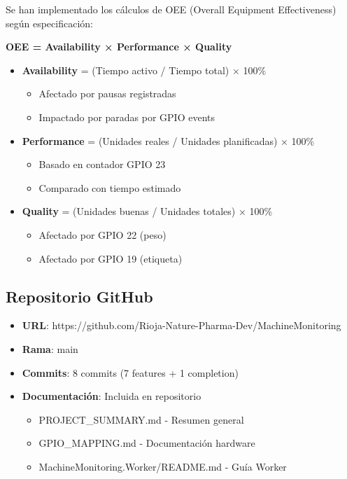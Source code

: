 Se han implementado los cálculos de OEE (Overall Equipment Effectiveness) según especificación:

\textbf{OEE = Availability × Performance × Quality}

\begin{itemize}
    \item \textbf{Availability} = (Tiempo activo / Tiempo total) × 100\%
    \begin{itemize}
        \item Afectado por pausas registradas
        \item Impactado por paradas por GPIO events
    \end{itemize}

    \item \textbf{Performance} = (Unidades reales / Unidades planificadas) × 100\%
    \begin{itemize}
        \item Basado en contador GPIO 23
        \item Comparado con tiempo estimado
    \end{itemize}

    \item \textbf{Quality} = (Unidades buenas / Unidades totales) × 100\%
    \begin{itemize}
        \item Afectado por GPIO 22 (peso)
        \item Afectado por GPIO 19 (etiqueta)
    \end{itemize}
\end{itemize}

\subsection{Repositorio GitHub}

\begin{itemize}
    \item \textbf{URL}: https://github.com/Rioja-Nature-Pharma-Dev/MachineMonitoring
    \item \textbf{Rama}: main
    \item \textbf{Commits}: 8 commits (7 features + 1 completion)
    \item \textbf{Documentación}: Incluida en repositorio
    \begin{itemize}
        \item PROJECT\_SUMMARY.md - Resumen general
        \item GPIO\_MAPPING.md - Documentación hardware
        \item MachineMonitoring.Worker/README.md - Guía Worker
    \end{itemize}
\end{itemize}

